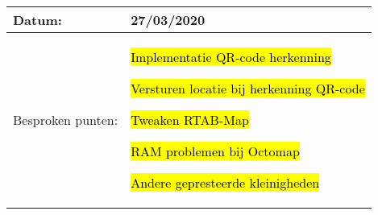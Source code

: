 \begin{tabularx}{\textwidth}{| l | X |}
    \hline
    Datum: & 27/03/2020\\
    \hline
    Besproken punten: &
    \begin{compactitem}
      \item \hl{Implementatie QR-code herkenning}
      \item \hl{Versturen locatie bij herkenning QR-code}
      \item \hl{Tweaken RTAB-Map}
      \item \hl{RAM problemen bij Octomap}
      \item \hl{Andere gepresteerde kleinigheden}
    \end{compactitem}\\
    \hline
  \end{tabularx}